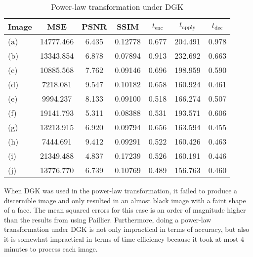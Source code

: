 \begin{table}[!ht]
	\centering
	\caption{Power-law transformation under DGK}
	\label{tbl:pwr-dgk}
    \begin{tabular}{lcccccc}
        \toprule
        Image & MSE  & PSNR & SSIM & $t_\text{enc}$ & $t_\text{apply}$ & $t_\text{dec}$ \\ \midrule
		(a) & 14777.466 & 6.435 & 0.12778 & 0.677 & 204.491 & 0.978 \\
		(b) & 13343.854 & 6.878 & 0.07894 & 0.913 & 232.692 & 0.663 \\
		(c) & 10885.568 & 7.762 & 0.09146 & 0.696 & 198.959 & 0.590 \\
		(d) & 7218.081 & 9.547 & 0.10182 & 0.658 & 160.924 & 0.461 \\
		(e) & 9994.237 & 8.133 & 0.09100 & 0.518 & 166.274 & 0.507 \\
		(f) & 19141.793 & 5.311 & 0.08388 & 0.531 & 193.571 & 0.606 \\
		(g) & 13213.915 & 6.920 & 0.09794 & 0.656 & 163.594 & 0.455 \\
		(h) & 7444.691 & 9.412 & 0.09291 & 0.522 & 160.426 & 0.463 \\
		(i) & 21349.488 & 4.837 & 0.17239 & 0.526 & 160.191 & 0.446 \\
		(j) & 13776.770 & 6.739 & 0.10769 & 0.489 & 156.763 & 0.460 \\
		\bottomrule
    \end{tabular}
\end{table}

When DGK was used in the power-law transformation, it failed to produce a discernible image and only resulted in an almost black image with a faint shape of a face. The mean squared errors for this case is an order of magnitude higher than the results from using Paillier. Furthermore, doing a power-law transformation under DGK is not only impractical in terms of accuracy, but also it is somewhat impractical in terms of time efficiency because it took at most 4 minutes to process each image.

